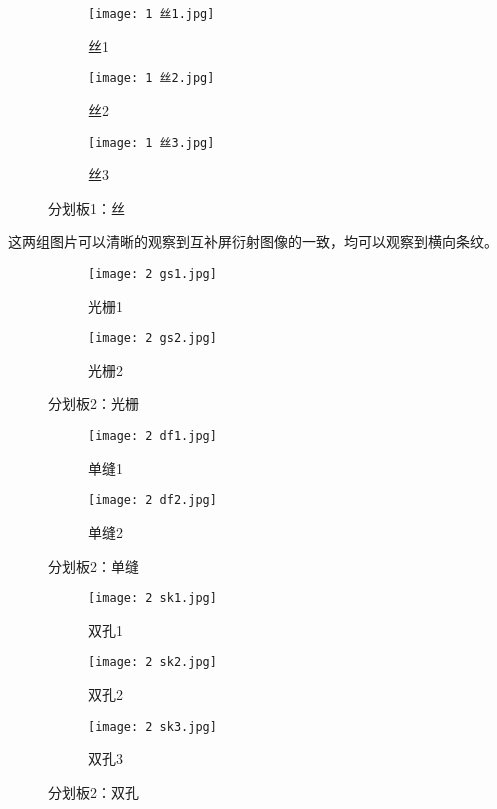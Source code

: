\documentclass[11pt]{article}
\begin{document}
	\begin{figure}[H]
		\centering
		\begin{subfigure}{0.32\textwidth}
			\texttt{[image: 1 丝1.jpg]}
			\caption{丝1}
		\end{subfigure}
		\begin{subfigure}{0.32\textwidth}
			\texttt{[image: 1 丝2.jpg]}
			\caption{丝2}
		\end{subfigure}
		\begin{subfigure}{0.32\textwidth}
			\texttt{[image: 1 丝3.jpg]}
			\caption{丝3}
		\end{subfigure}
		\caption{分划板1：丝}
		\label{fig:1丝}
	\end{figure}
	这两组图片可以清晰的观察到互补屏衍射图像的一致，均可以观察到横向条纹。
	
	\begin{figure}[H]
		\centering
		\begin{subfigure}[t]{0.45\textwidth}  %
			\centering
			\texttt{[image: 2 gs1.jpg]}  %
			\caption{光栅1}
		\end{subfigure}
		\begin{subfigure}[t]{0.45\textwidth}  %
			\centering
			\texttt{[image: 2 gs2.jpg]}  %
			\caption{光栅2}
		\end{subfigure}
		\caption{分划板2：光栅}
		\label{fig:2光栅}
	\end{figure}
	
	\begin{figure}[H]
		\centering
		\begin{subfigure}[t]{0.45\textwidth}  %
			\centering
			\texttt{[image: 2 df1.jpg]}  %
			\caption{单缝1}
		\end{subfigure}
		\begin{subfigure}[t]{0.45\textwidth}  %
			\centering
			\texttt{[image: 2 df2.jpg]}  %
			\caption{单缝2}
		\end{subfigure}
		\caption{分划板2：单缝}
		\label{fig:2单缝}
	\end{figure}
	
	\begin{figure}[H]
		\centering
		\begin{subfigure}{0.32\textwidth}
			\texttt{[image: 2 sk1.jpg]}
			\caption{双孔1}
		\end{subfigure}
		\begin{subfigure}{0.32\textwidth}
			\texttt{[image: 2 sk2.jpg]}
			\caption{双孔2}
		\end{subfigure}
		\begin{subfigure}{0.32\textwidth}
			\texttt{[image: 2 sk3.jpg]}
			\caption{双孔3}
		\end{subfigure}
		\caption{分划板2：双孔}
		\label{fig:2双孔}
	\end{figure}
	
\end{document}
